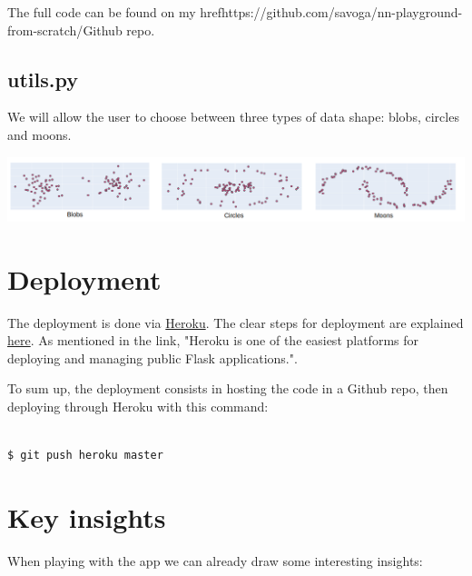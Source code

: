 The full code can be found on my href{https://github.com/savoga/nn-playground-from-scratch/}{Github repo}. \\

\subsection{utils.py}

We will allow the user to choose between three types of data shape: blobs, circles and moons. \\

\begin{center}
\includegraphics[scale=0.3]{img/data_generation.png}
\end{center}

\section{Deployment}

The deployment is done via \href{https://www.heroku.com/}{Heroku}. The clear steps for deployment are explained \href{https://dash.plotly.com/deployment}{here}. As mentioned in the link, "Heroku is one of the easiest platforms for deploying and managing public Flask applications.".

To sum up, the deployment consists in hosting the code in a Github repo, then deploying through Heroku with this command:

\lstset{language=bash}
\lstset{frame=lines}
\lstset{basicstyle=\footnotesize}
\begin{lstlisting}

$ git push heroku master

\end{lstlisting}

\vspace{5mm}

\section{Key insights}

When playing with the app we can already draw some interesting insights: \\

